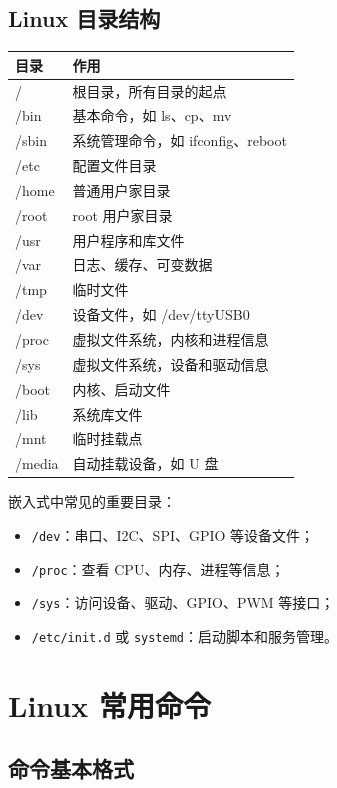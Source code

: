 \documentclass[UTF8,a4paper,12pt]{ctexart}
\begin{document}
\subsection{Linux 目录结构}

\begin{longtable}{p{4cm}p{10cm}}
\toprule
目录 & 作用 \\
\midrule
/ & 根目录，所有目录的起点 \\
/bin & 基本命令，如 ls、cp、mv \\
/sbin & 系统管理命令，如 ifconfig、reboot \\
/etc & 配置文件目录 \\
/home & 普通用户家目录 \\
/root & root 用户家目录 \\
/usr & 用户程序和库文件 \\
/var & 日志、缓存、可变数据 \\
/tmp & 临时文件 \\
/dev & 设备文件，如 /dev/ttyUSB0 \\
/proc & 虚拟文件系统，内核和进程信息 \\
/sys & 虚拟文件系统，设备和驱动信息 \\
/boot & 内核、启动文件 \\
/lib & 系统库文件 \\
/mnt & 临时挂载点 \\
/media & 自动挂载设备，如 U 盘 \\
\bottomrule
\end{longtable}

嵌入式中常见的重要目录：
\begin{itemize}
    \item \texttt{/dev}：串口、I2C、SPI、GPIO 等设备文件；
    \item \texttt{/proc}：查看 CPU、内存、进程等信息；
    \item \texttt{/sys}：访问设备、驱动、GPIO、PWM 等接口；
    \item \texttt{/etc/init.d} 或 \texttt{systemd}：启动脚本和服务管理。
\end{itemize}

\section{Linux 常用命令}

\subsection{命令基本格式}
\end{document}
